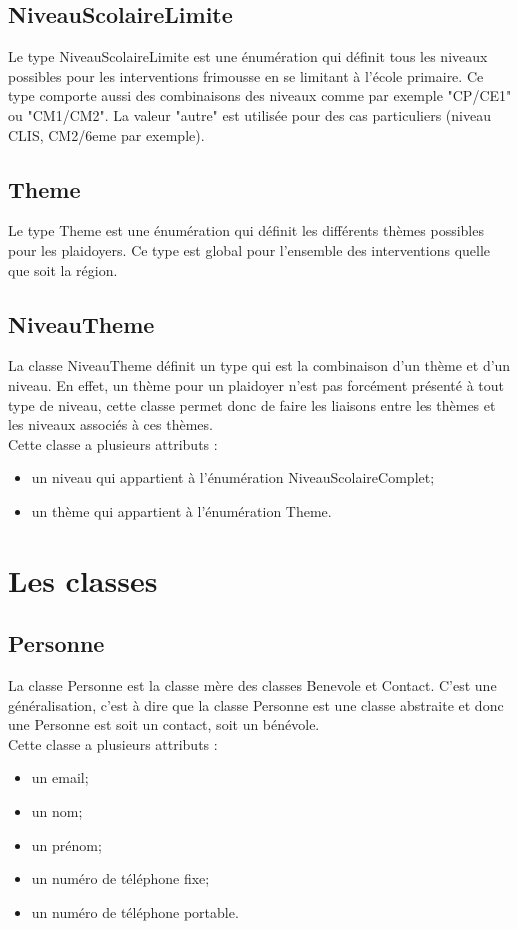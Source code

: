\documentclass[asi, sansVersion]{picInsa}
\begin{document}
\subsection*{NiveauScolaireLimite}

Le type NiveauScolaireLimite est une énumération qui définit tous les niveaux possibles pour les interventions frimousse en se limitant à l'école primaire. Ce type comporte aussi des combinaisons des niveaux comme par exemple "CP/CE1" ou "CM1/CM2". La valeur "autre" est utilisée pour des cas particuliers (niveau CLIS, CM2/6eme par exemple).

\subsection*{Theme}

Le type Theme est une énumération qui définit les différents thèmes possibles pour les plaidoyers. Ce type est global pour l'ensemble des interventions quelle que soit la région.  

\subsection*{NiveauTheme}

La classe NiveauTheme définit un type qui est la combinaison d'un thème et d'un niveau. En effet, un thème pour un plaidoyer n'est pas forcément présenté à tout type de niveau, cette classe permet donc de faire les liaisons entre les thèmes et les niveaux associés à ces thèmes.\\
Cette classe a plusieurs attributs : 
\begin{itemize}
\item un niveau qui appartient à l'énumération NiveauScolaireComplet;
\item un thème qui appartient à l'énumération Theme.
\end{itemize}


\section{Les classes}

\subsection*{Personne}

La classe Personne est la classe mère des classes Benevole et Contact. C'est une généralisation, c'est à dire que la classe Personne est une classe abstraite et donc une Personne est soit un contact, soit un bénévole. \\
Cette classe a plusieurs attributs : 
\begin{itemize}
\item un email;
\item un nom;
\item un prénom;
\item un numéro de téléphone fixe;
\item un numéro de téléphone portable.
\end{itemize}
\end{document}
